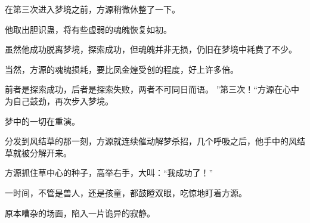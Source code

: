 \begin{this_body}
在第三次进入梦境之前，方源稍微休整了一下。

他取出胆识蛊，将有些虚弱的魂魄恢复如初。

虽然他成功脱离梦境，探索成功，但魂魄并非无损，仍旧在梦境中耗费了不少。

当然，方源的魂魄损耗，要比凤金煌受创的程度，好上许多倍。

前者是探索成功，后者是探索失败，两者不可同日而语。 ”第三次！“方源在心中为自己鼓劲，再次步入梦境。

梦中的一切在重演。

分发到风结草的那一刻，方源就连续催动解梦杀招，几个呼吸之后，他手中的风结草就被分解开来。

方源抓住草中心的种子，高举右手，大叫：“我成功了！”

一时间，不管是兽人，还是孩童，都鼓瞪双眼，吃惊地盯着方源。

原本嘈杂的场面，陷入一片诡异的寂静。

\end{this_body}

